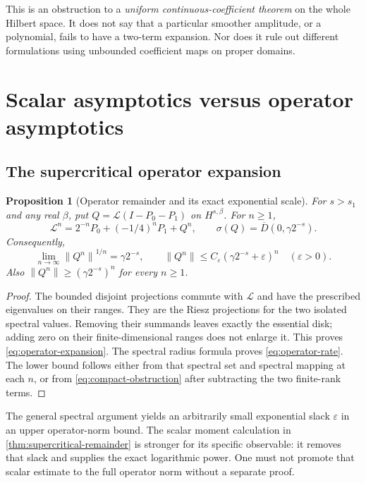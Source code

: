 \documentclass[11pt,a4paper]{article}
\newtheorem{proposition}[theorem]{Proposition}
\theoremstyle{definition}
\theoremstyle{remark}
\newcommand{\Lop}{\mathcal L}
\newcommand{\norm}[1]{\left\lVert#1\right\rVert}
\newcommand{\Disk}[1]{\overline{D}(0,#1)}
\numberwithin{equation}{section}
\begin{document}
This is an obstruction to a \emph{uniform continuous-coefficient theorem}
on the whole Hilbert space. It does not say that a particular smoother
amplitude, or a polynomial, fails to have a two-term expansion. Nor does
it rule out different formulations using unbounded coefficient maps on
proper domains.

\section{Scalar asymptotics versus operator asymptotics}
\label{sec:operator-scalar}

\subsection{The supercritical operator expansion}
\begin{proposition}[Operator remainder and its exact exponential scale]
\label{prop:operator-expansion}
For $s>s_1$ and any real $\beta$, put
$Q=\Lop(I-P_0-P_1)$ on $H^{s,\beta}$. For $n\ge1$,
\begin{equation}
 \Lop^n=2^{-n}P_0+(-1/4)^nP_1+Q^n,
 \qquad \sigma(Q)=\Disk{\gamma2^{-s}}.
 \label{eq:operator-expansion}
\end{equation}
Consequently,
\begin{equation}
 \lim_{n\to\infty}\norm{Q^n}^{1/n}=\gamma2^{-s},\qquad
 \norm{Q^n}\le C_\varepsilon(\gamma2^{-s}+\varepsilon)^n
 \quad(\varepsilon>0).
 \label{eq:operator-rate}
\end{equation}
Also $\norm{Q^n}\ge(\gamma2^{-s})^n$ for every $n\ge1$.
\end{proposition}
\begin{proof}
The bounded disjoint projections commute with $\Lop$ and have the
prescribed eigenvalues on their ranges. They are the Riesz projections
for the two isolated spectral values. Removing their summands leaves
exactly the essential disk; adding zero on their finite-dimensional
ranges does not enlarge it. This proves \eqref{eq:operator-expansion}.
The spectral radius formula proves \eqref{eq:operator-rate}. The lower
bound follows either from that spectral set and spectral mapping at
each $n$, or from \eqref{eq:compact-obstruction} after subtracting the
two finite-rank terms.
\end{proof}

The general spectral argument yields an arbitrarily small exponential
slack $\varepsilon$ in an upper operator-norm bound. The scalar moment
calculation in \cref{thm:supercritical-remainder} is stronger for its
specific observable: it removes that slack and supplies the exact
logarithmic power. One must not promote that scalar estimate to the full
operator norm without a separate proof.
\end{document}
